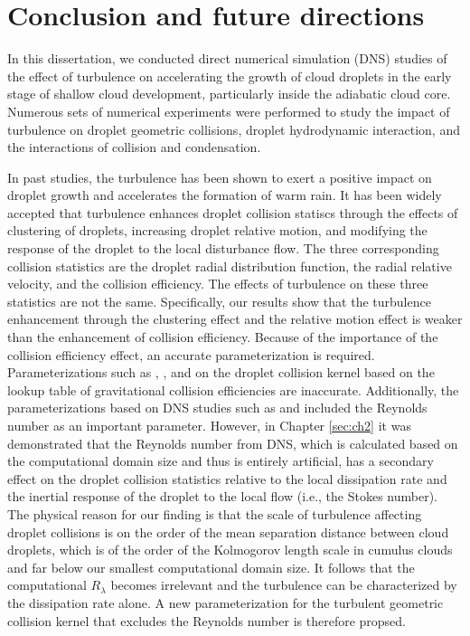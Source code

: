 \resetdatestamp

\chapter{Conclusion and future directions}\label{sec:ch5}

\newpage

In this dissertation, we conducted direct numerical simulation (DNS) studies of the effect of turbulence on accelerating the growth of cloud droplets in the early stage of shallow cloud development, particularly inside the adiabatic cloud core. Numerous sets of numerical experiments were performed to study the impact of turbulence on droplet geometric collisions, droplet hydrodynamic interaction, and the interactions of collision and condensation. 

In past studies, the turbulence has been shown to exert a positive impact on droplet growth and accelerates the formation of warm rain. It has been widely accepted that turbulence enhances droplet collision statiscs through the effects of clustering of droplets, increasing droplet relative motion, and modifying the response of the droplet to the local disturbance flow. The three corresponding collision statistics are the droplet radial distribution function, the radial relative velocity, and the collision efficiency. The effects of turbulence on these three statistics are not the same. Specifically, our results show that the turbulence enhancement through the clustering effect and the relative motion effect is weaker than the enhancement of collision efficiency. Because of the importance of the collision efficiency effect, an accurate parameterization is required. Parameterizations such as \citet{Riemer2005}, \citet{Xue2008}, and \citet{Franklin2008} on the droplet collision kernel based on the lookup table of gravitational collision efficiencies are inaccurate. Additionally, the parameterizations based on DNS studies such as \citet{Franklin2007} and \citet{Ayala2008b} included the Reynolds number as an important parameter. However, in Chapter \ref{sec:ch2} it was demonstrated that the Reynolds number from DNS, which is calculated based on the computational domain size and thus is entirely artificial, has a secondary effect on the droplet collision statistics relative to the local dissipation rate and the inertial response of the droplet to the local flow (i.e., the Stokes number). The physical reason for our finding is that the scale of turbulence affecting droplet collisions is on the order of the mean separation distance between cloud droplets, which is of the order of the Kolmogorov length scale in cumulus clouds and far below our smallest computational domain size. It follows that the computational $R_\lambda$ becomes irrelevant and the turbulence can be characterized by the dissipation rate alone. A new parameterization for the turbulent geometric collision kernel that excludes the Reynolds number is therefore propsed. 

